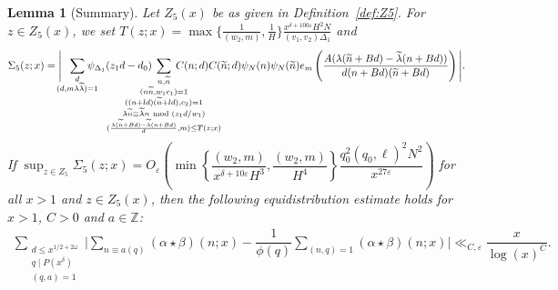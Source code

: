 \documentclass{amsart}
\newtheorem{lemma}{Lemma}
\numberwithin{equation}{section}
\begin{document}
\begin{lemma}[Summary]
\vspace{3mm} Let $Z_5(x)$ be as given in Definition~{\rm\ref{def:Z5}}. 
For $z \in Z_5(x)$, we set $T(z;x) = \max\{\tfrac{1}{(w_2,m)}, \tfrac{1}{H}\} \tfrac{x^{\delta+100\varepsilon}H^2 N}{(v_1,v_2)\Delta_1}$ and
 \begin{align*}
\Sigma_5(z;x)= \Bigg|\!\!\!\!\sum_{\substack{d \\   (d,m \lambda \widetilde{\lambda})=1}}\!\!\!\!\!\!\!\psi_{\Delta_1}(z_1d-d_0) \!\!\!\!\!\!\!\!\!\!\!\!\!\!\!\!\!\!\!\!\!\!\!\!\!\!\!\sum_{\substack{n, \widetilde{n} \\ (n\widetilde{n},w_1 c_1)=1 \\ ((n+l d)(\widetilde{n}+l d ), c_2)=1  \\ \lambda \widetilde{n} \equiv 
\widetilde{\lambda}n  \mbox{ \scriptsize mod } (z_1 d/w_1) \\ (\frac{\lambda (\widetilde{n} +Bd)-\widetilde{\lambda}(n+Bd)}{d},m ) \leq T(z;x)}} \!\!\!\!\!\! \!\!\!\!\!\!\!\!\!\!\!\!\!\!\!\!\!\!\!\!\! C(n;d)  C(\widetilde{n};d)\psi_N(n)\psi_N(\widetilde{n}) e_{m}\left(\dfrac{A (\lambda(\widetilde{n}+B d)-  \widetilde{\lambda}(n+B d))}{d(n+B d)(\widetilde{n}+B d)}\right)\Bigg|. 
\end{align*}
If $\sup_{z \in Z_5}\Sigma_5(z;x) = O_\varepsilon\!\left(\min\left\{\dfrac{(w_2,m)}{x^{\delta+10\varepsilon}H^3}, \dfrac{ (w_2,m)}{H^4}\right\}\dfrac{q_0^2(q_0,\ell)^2 N^2 }{x^{27\varepsilon}}\right) $ for all $x>1$ and $z \in Z_5(x)$,  then the following equidistribution estimate holds for  $x>1$, $C >0$ and  $a \in \mathbb{Z}$:
\begin{align*} 
\sum_{\substack{d \leq x^{1/2+2\omega} \\ q \mid P(x^\delta) \\ (q,a)=1}}\Bigg| \sum_{n \equiv a(q)} (\alpha \star \beta)(n;x) - \dfrac{1}{\phi(q)} \sum_{(n,q)=1} (\alpha \star \beta)(n;x)\Bigg| \ll_{C,\varepsilon}  \dfrac{x}{\log(x)^C}.
\end{align*}
\end{lemma}
\end{document}
